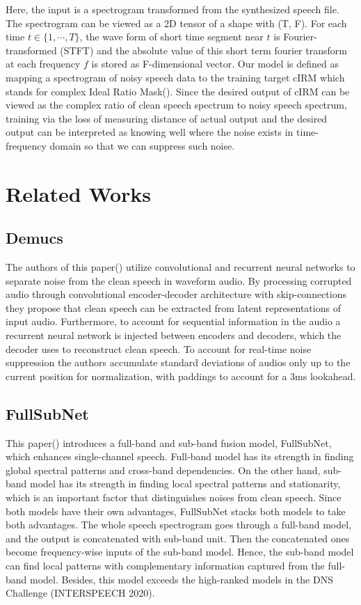\documentclass{article}
\begin{document}
Here, the input is a spectrogram transformed from the synthesized speech file. The spectrogram can be viewed as a 2D tensor of a shape with (T, F). For each time $t \in \{1, \cdots, T\}$, the wave form of short time segment near $t$ is Fourier-transformed (STFT) and the absolute value of this short term fourier transform at each frequency $f$ is stored as F-dimensional vector. Our model is defined as mapping a spectrogram of noisy speech data to the training target cIRM which stands for complex Ideal Ratio Mask(\cite{CIRM}). Since the desired output of cIRM can be viewed as the complex ratio of clean speech spectrum to noisy speech spectrum, training via the loss of measuring distance of actual output and the desired output can be interpreted as knowing well where the noise exists in time-frequency domain so that we can suppress such noise.


\section{Related Works}
\label{related_works}

\subsection{Demucs}

The authors of this paper(\cite{Demucs}) utilize convolutional and recurrent neural networks to separate noise from the clean speech in waveform audio. By processing corrupted audio through convolutional encoder-decoder architecture with skip-connections they propose that clean speech can be extracted from latent representations of input audio. Furthermore, to account for sequential information in the audio a recurrent neural network is injected between encoders and decoders, which the decoder uses to reconstruct clean speech. To account for real-time noise suppression the authors accumulate standard deviations of audios only up to the current position for normalization, with paddings to account for a 3ms lookahead.


\subsection{FullSubNet}

This paper(\cite{fullsubnet}) introduces a full-band and sub-band fusion model, FullSubNet, which enhances single-channel speech. Full-band model has its strength in finding global spectral patterns and cross-band dependencies. On the other hand, sub-band model has its strength in finding local spectral patterns and stationarity, which is an important factor that distinguishes noises from clean speech. Since both models have their own advantages, FullSubNet stacks both models to take both advantages. The whole speech spectrogram goes through a full-band model, and the output is concatenated with sub-band unit. Then the concatenated ones become frequency-wise inputs of the sub-band model. Hence, the sub-band model can find local patterns with complementary information captured from the full-band model. Besides, this model exceeds the high-ranked models in the DNS Challenge (INTERSPEECH 2020).
\end{document}
